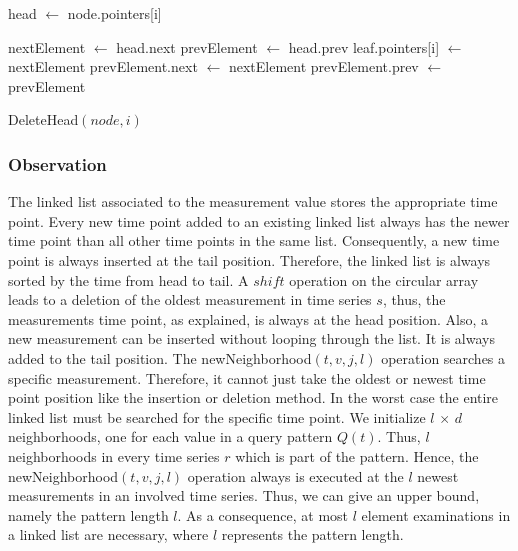 \documentclass[abstracton,12pt,oneside]{scrreprt}
\begin{document}

\begin{algorithm}[H]
	\IncMargin{1em}
	\DontPrintSemicolon
	


	head $\leftarrow$ node.pointers[i]\;
	
	nextElement $\leftarrow$ head.next\; 
	prevElement $\leftarrow$ head.prev\; 
	\BlankLine
	leaf.pointers[i] $\leftarrow$  nextElement\;
	prevElement.next $\leftarrow$ nextElement\;
	prevElement.prev $\leftarrow$ prevElement\;


	\caption{DeleteHead$(node, i)$}
		\label{deleteListValue}
\end{algorithm}

\subsubsection{Observation}
The linked list associated to the measurement value stores the appropriate time point. Every new time point added to an existing linked list always has the newer time point than all other time points in the same list. Consequently, a new time point is always inserted at the tail position. Therefore, the linked list is always sorted by the time from head to tail. A $shift$ operation on the circular array leads to a deletion of the oldest measurement in time series $s$, thus, the measurements time point, as explained, is always at the head position. Also, a new measurement can be inserted without looping through the list. It is always added to the tail position. The newNeighborhood$(t,v,j,l)$ operation searches a specific measurement. Therefore, it cannot just take the oldest or newest time point position like the insertion or deletion method. In the worst case the entire linked list must be searched for the specific time point. We initialize $l$ $\times$ $d$ neighborhoods, one for each value in a query pattern $Q(t)$. Thus, $l$ neighborhoods in every time series $r$ which is part of the pattern. Hence, the newNeighborhood$(t,v,j,l)$ operation always is executed at the $l$ newest measurements in an involved time series. Thus, we can give an upper bound, namely the pattern length $l$. As a consequence, at most $l$ element examinations in a linked list are necessary, where $l$ represents the pattern length.
\end{document}

